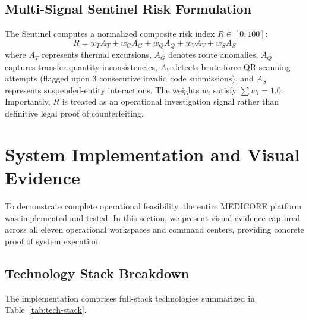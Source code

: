 \documentclass[pdflatex,sn-mathphys-num]{sn-jnl}
\theoremstyle{thmstyleone}
\theoremstyle{thmstyletwo}
\theoremstyle{thmstylethree}
\begin{document}
\subsection{Multi-Signal Sentinel Risk Formulation}

The Sentinel computes a normalized composite risk index $R \in [0, 100]$:
\begin{equation}
R = w_T A_T + w_G A_G + w_Q A_Q + w_V A_V + w_S A_S
\label{eq:risk-index}
\end{equation}
where $A_T$ represents thermal excursions, $A_G$ denotes route anomalies, $A_Q$ captures transfer quantity inconsistencies, $A_V$ detects brute-force QR scanning attempts (flagged upon 3 consecutive invalid code submissions), and $A_S$ represents suspended-entity interactions. The weights $w_i$ satisfy $\sum w_i = 1.0$. Importantly, $R$ is treated as an operational investigation signal rather than definitive legal proof of counterfeiting.


\section{System Implementation and Visual Evidence}\label{sec:visual-evidence}

To demonstrate complete operational feasibility, the entire MEDICORE platform was implemented and tested. In this section, we present visual evidence captured across all eleven operational workspaces and command centers, providing concrete proof of system execution.

\subsection{Technology Stack Breakdown}

The implementation comprises full-stack technologies summarized in Table~\ref{tab:tech-stack}.
\end{document}
